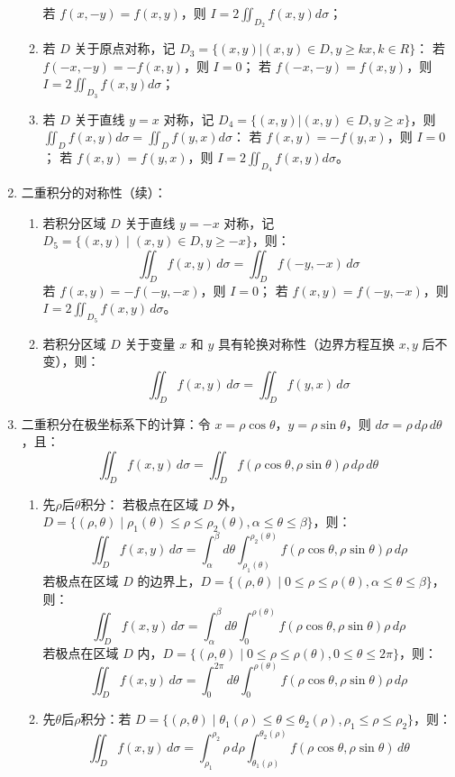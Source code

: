 \documentclass[UTF8]{ctexart}
\theoremstyle{remark}
\begin{document}
\begin{enumerate}
\begin{enumerate}
	若 \(f(x, -y) = f(x, y)\)，则 \(I = 2 \iint_{D_{2}} f(x, y) d \sigma\)；
				\item 若 \(D\) 关于原点对称，记 \(D_{3} = \{(x, y) | (x, y) \in D, y \geq kx, k \in R\}\)：
	若 \(f(-x, -y) = -f(x, y)\)，则 \(I = 0\)；
	若 \(f(-x, -y) = f(x, y)\)，则 \(I = 2 \iint_{D_{3}} f(x, y) d \sigma\)；
				\item 若 \(D\) 关于直线 \(y = x\) 对称，记 \(D_{4} = \{(x, y) | (x, y) \in D, y \geq x\}\)，则 \(\iint_{D} f(x, y) d \sigma = \iint_{D} f(y, x) d \sigma\)：
	若 \(f(x, y) = -f(y, x)\)，则 \(I = 0\)；
	若 \(f(x, y) = f(y, x)\)，则 \(I = 2 \iint_{D_{4}} f(x, y) d \sigma\)。
			\end{enumerate}

		
		\item 二重积分的对称性（续）：
		\begin{enumerate}
			\item 若积分区域 \(D\) 关于直线 \(y = -x\) 对称，记 \(D_5 = \{(x, y) \mid (x, y) \in D, y \geq -x\}\)，则：
			\[
			\iint_D f(x, y) \, d\sigma = \iint_D f(-y, -x) \, d\sigma
			\]
若 \(f(x, y) = -f(-y, -x)\)，则 \(I = 0\)；
若 \(f(x, y) = f(-y, -x)\)，则 \(I = 2\iint_{D_5} f(x, y) \, d\sigma\)。
			\item 若积分区域 \(D\) 关于变量 \(x\) 和 \(y\) 具有轮换对称性（边界方程互换 \(x, y\) 后不变），则：
			\[
			\iint_D f(x, y) \, d\sigma = \iint_D f(y, x) \, d\sigma
			\]
		\end{enumerate}
		
		\item 二重积分在极坐标系下的计算：令 \(x = \rho \cos\theta\)，\(y = \rho \sin\theta\)，则 \(d\sigma = \rho \, d\rho \, d\theta\)，且：
		\[
		\iint_D f(x, y) \, d\sigma = \iint_D f(\rho \cos\theta, \rho \sin\theta) \rho \, d\rho \, d\theta
		\]
		\begin{enumerate}
			\item 先\(\rho\)后\(\theta\)积分：
若极点在区域 \(D\) 外，\(D = \{(\rho, \theta) \mid \rho_1(\theta) \leq \rho \leq \rho_2(\theta), \alpha \leq \theta \leq \beta\}\)，则：
			\[
			\iint_D f(x, y) \, d\sigma = \int_\alpha^\beta d\theta \int_{\rho_1(\theta)}^{\rho_2(\theta)} f(\rho \cos\theta, \rho \sin\theta) \rho \, d\rho
			\]
若极点在区域 \(D\) 的边界上，\(D = \{(\rho, \theta) \mid 0 \leq \rho \leq \rho(\theta), \alpha \leq \theta \leq \beta\}\)，则：
			\[
			\iint_D f(x, y) \, d\sigma = \int_\alpha^\beta d\theta \int_0^{\rho(\theta)} f(\rho \cos\theta, \rho \sin\theta) \rho \, d\rho
			\]
若极点在区域 \(D\) 内，\(D = \{(\rho, \theta) \mid 0 \leq \rho \leq \rho(\theta), 0 \leq \theta \leq 2\pi\}\)，则：
			\[
			\iint_D f(x, y) \, d\sigma = \int_0^{2\pi} d\theta \int_0^{\rho(\theta)} f(\rho \cos\theta, \rho \sin\theta) \rho \, d\rho
			\]
			\item 先\(\theta\)后\(\rho\)积分：若 \(D = \{(\rho, \theta) \mid \theta_1(\rho) \leq \theta \leq \theta_2(\rho), \rho_1 \leq \rho \leq \rho_2\}\)，则：
			\[
			\iint_D f(x, y) \, d\sigma = \int_{\rho_1}^{\rho_2} \rho \, d\rho \int_{\theta_1(\rho)}^{\theta_2(\rho)} f(\rho \cos\theta, \rho \sin\theta) \, d\theta
			\]
		\end{enumerate}
		

\end{enumerate}
\end{document}
